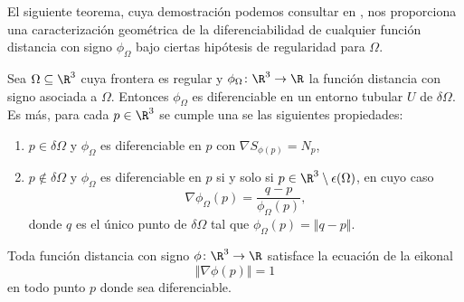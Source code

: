 El siguiente teorema, cuya demostración podemos consultar en \cite{dif1}, nos proporciona una caracterización geométrica de la diferenciabilidad de cualquier función distancia con signo $\phi_{\Omega}$ bajo ciertas hipótesis de regularidad para $\Omega$.
\begin{teorema}\label{teo:diff}
    Sea $\Omega \subseteq \R^3$ cuya frontera es regular y $\phi_{\Omega} \colon \R^3\to \R$ la función distancia con signo asociada a $\Omega$. Entonces $\phi_{\Omega}$ es diferenciable en un entorno tubular $U$ de $\delta \Omega$. Es más, para cada $p\in \R^3$ se cumple una se las siguientes propiedades:
    \begin{enumerate}
        \item $p\in \delta \Omega$ y $\phi_{\Omega}$ es diferenciable en $p$ con $\nabla S_{\phi(p)} = N_p$,
        \item $p\notin \delta \Omega$ y $\phi_{\Omega}$ es diferenciable en $p$ si y solo si $p\in \R^3\setminus \epsilon(\Omega)$, en cuyo caso
        \begin{equation*}
            \nabla \phi_{\Omega}(p) = \frac{q-p}{\phi_{\Omega}(p)},
        \end{equation*}
        donde $q$ es el único punto de $\delta\Omega$ tal que $\phi_{\Omega}(p) = \Vert q-p\Vert$.
    \end{enumerate}
\end{teorema}

\begin{corolario}
    Toda función distancia con signo $\phi\colon \R^3\to \R$ satisface la ecuación de la eikonal 
    \begin{equation*}
        \Vert \nabla \phi(p)\Vert = 1
    \end{equation*}
    en todo punto $p$ donde sea diferenciable.
\end{corolario}
    


